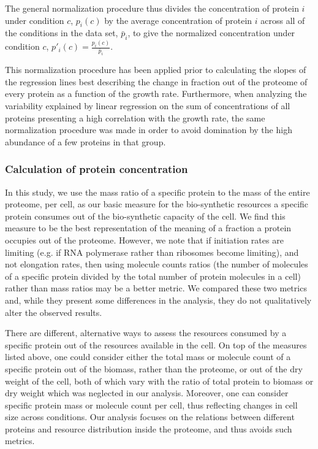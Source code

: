 \documentclass[a4paper]{article}
\begin{document}
The general normalization procedure thus divides the concentration of protein $i$ under condition $c$, $p_i(c)$ by the average concentration of protein $i$ across all of the conditions in the data set, $\bar{p}_i$, to give the normalized concentration under condition $c$, $p'_i(c)=\frac{p_i(c)}{\bar{p}_i}$.

This normalization procedure has been applied prior to calculating the slopes of the regression lines best describing the change in fraction out of the proteome of every protein as a function of the growth rate.
Furthermore, when analyzing the variability explained by linear regression on the sum of concentrations of all proteins presenting a high correlation with the growth rate, the same normalization procedure was made in order to avoid domination by the high abundance of a few proteins in that group.

\subsubsection{Calculation of protein concentration}
\label{protconc} 

In this study, we use the mass ratio of a specific protein to the mass of the entire proteome, per cell, as our basic measure for the bio-synthetic resources a specific protein consumes out of the bio-synthetic capacity of the cell.
We find this measure to be the best representation of the meaning of a fraction a protein occupies out of the proteome.
However, we note that if initiation rates are limiting (e.g. if RNA polymerase rather than ribosomes become limiting), and not elongation rates, then using molecule counts ratios (the number of molecules of a specific protein divided by the total number of protein molecules in a cell) rather than mass ratios may be a better metric.
We compared these two metrics and, while they present some differences in the analysis, they do not qualitatively alter the observed results.

There are different, alternative ways to assess the resources consumed by a specific protein out of the resources available in the cell.
On top of the measures listed above, one could consider either the total mass or molecule count of a specific protein out of the biomass, rather than the proteome, or out of the dry weight of the cell, both of which vary with the ratio of total protein to biomass or dry weight which was neglected in our analysis.
Moreover, one can consider specific protein mass or molecule count per cell, thus reflecting changes in cell size across conditions.
Our analysis focuses on the relations between different proteins and resource distribution inside the proteome, and thus avoids such metrics.
\end{document}
